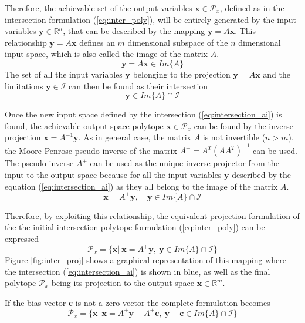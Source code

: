 Therefore, the achievable set of the output variables $\bm{x}\in \mathcal{P}_x$, defined as in the intersection formulation (\ref{eq:inter_poly}), will be entirely generated by the input variables $\bm{y}\in \mathbb{R}^n$, that can be described by the mapping $\bm{y} = A \bm{x}$. This relationship $\bm{y} = A \bm{x}$ defines an $m$ dimensional subspace of the $n$ dimensional input space, which is also called the image of the matrix $A$. 
\begin{equation}
    \bm{y}=A\bm{x} \in Im \{A\}
\end{equation}
The set of all the input variables $\bm{y}$ belonging to the projection $\bm{y} = A \bm{x}$ and the limitations $\bm{y}\in\mathcal{I}$ can then be found as their intersection
\begin{equation}
   \bm{y} \in Im\{A\} \cap \mathcal{I}
    \label{eq:intersection_ai}
\end{equation}

Once the new input space defined by the intersection (\ref{eq:intersection_ai}) is found, the achievable output space polytope $ \bm{x}\in\mathcal{P}_x$ can be found by the inverse projection $\bm{x}=A^{-1}\bm{y}$. As in general case, the matrix $A$ is not invertible ($n>m$), the Moore-Penrose pseudo-inverse of the matrix $A^+ = A^T(AA^T)^{-1}$ can be used. The pseudo-inverse $A^+$ can be used as the unique inverse projector from the input to the output space because for all the input variables $\bm{y}$ described by the equation (\ref{eq:intersection_ai}) as they all belong to the image of the matrix $A$. 
\begin{equation}
    \bm{x} = A^+ \bm{y}, \quad \bm{y} \in Im\{A\}\cap\mathcal{I}
\end{equation}

Therefore,  by exploiting this relationship,  the equivalent projection formulation of the the initial intersection polytope formulation (\ref{eq:inter_poly}) can be expressed
\begin{equation}
\mathcal{P}_x=\{\bm{x} |~ \bm{x} = A^+\bm{y},~ \bm{y} \in Im\{A\}\cap\mathcal{I}\} \label{eq:proj_inter}
\end{equation}
Figure \ref{fig:inter_proj} shows a graphical representation of this mapping where the intersection (\ref{eq:intersection_ai}) is shown in blue, as well as the final polytope $\mathcal{P}_x$ being its projection to the output space $\bm{x}\in \mathbb{R}^m$. 

If the bias vector $\bm{c}$ is not a zero vector the complete formulation becomes
\begin{equation}
\mathcal{P}_x=\{\bm{x} |~ \bm{x} = A^+\bm{y} - A^+\bm{c},~ \bm{y} - \bm{c}\in Im\{A\}\cap\mathcal{I}\} 
\end{equation}

